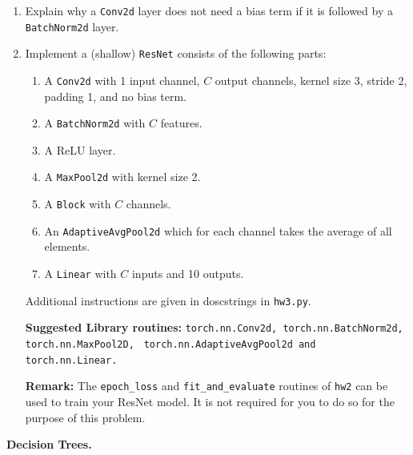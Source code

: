 \begin{enumerate}[font={\Large\bfseries},left=0pt]
\begin{Q}
\begin{enumerate}
        \item Explain why a \texttt{Conv2d} layer does not need a bias term if it is followed by a \texttt{BatchNorm2d} layer.

        \item Implement a (shallow) \texttt{ResNet} consists of the following parts:
        \begin{enumerate}
            \item A \texttt{Conv2d} with 1 input channel, $C$ output channels, kernel size 3, stride 2, padding 1, and no bias term.
            \item A \texttt{BatchNorm2d} with $C$ features.
            \item A ReLU layer.
            \item A \texttt{MaxPool2d} with kernel size 2.
            \item A \texttt{Block} with $C$ channels.
            \item An \texttt{AdaptiveAvgPool2d} which for each channel takes the average of all elements.
            \item A \texttt{Linear} with $C$ inputs and 10 outputs.
        \end{enumerate}
        Additional instructions are given in doscstrings in \texttt{hw3.py}.
        
        \textbf{Suggested Library routines:} \texttt{torch.nn.Conv2d, torch.nn.BatchNorm2d, torch.nn.MaxPool2D, }
        \texttt{torch.nn.AdaptiveAvgPool2d and torch.nn.Linear.}
        
        
        
        \textbf{Remark:} The \texttt{epoch\_loss} and \texttt{fit\_and\_evaluate} routines of \texttt{hw2} can be used to train your ResNet model. It is not required for you to do so for the purpose of this problem.
    \end{enumerate}
\end{Q}

   
          \begin{Q}
             \textbf{\Large Decision Trees.}


\end{Q}
\end{enumerate}
